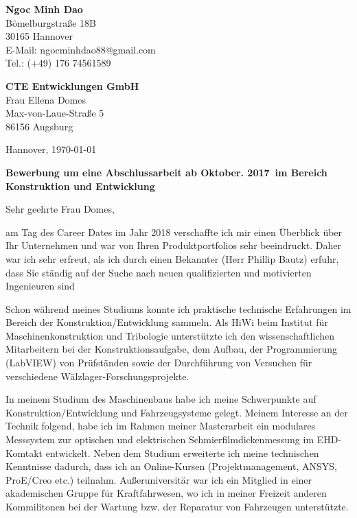 \documentclass[11pt,a4paper]{letter}
\newcommand{\FirmaName}{CTE Entwicklungen GmbH}
\newcommand{\FirmaAdresseLineOne}{Max-von-Laue-Straße 5}
\newcommand{\FirmaAdresseLineTwo}{86156 Augsburg}
\newcommand{\JobName}{Konstruktion und Entwicklung}
\newcommand{\JobRefNummer}{WO 71030}
\newcommand{\AnsprechpartnerVoll}{Frau Ellena Domes}
\newcommand{\Ansprechpartner}{Maier}
\newcommand{\Ansprechpartnerin}{Domes}
\newcommand{\Beginntermin}{Oktober. 2017}
\begin{document}
\pagestyle{empty}

\begin{flushleft}
    \textbf{Ngoc Minh Dao}\\
    Bömelburgstraße 18B\\
    30165 Hannover\\
    E-Mail: ngocminhdao88@gmail.com\\
    Tel.: (+49) 176 74561589
\end{flushleft}

\begin{flushleft}
    \textbf{\FirmaName}\\
    \AnsprechpartnerVoll\\
    \FirmaAdresseLineOne\\
    \FirmaAdresseLineTwo\\
\end{flushleft}

\begin{flushright}
    Hannover, \today
\end{flushright}

\textbf{Bewerbung um eine Abschlussarbeit ab \Beginntermin~im Bereich \JobName}\\
\vspace{1em}

Sehr geehrte Frau \Ansprechpartnerin,

am Tag des Career Dates im Jahr 2018 verschaffte ich mir einen Überblick über Ihr Unternehmen und war von Ihren Produktportfolios sehr beeindruckt.
Daher war ich sehr erfreut, als ich durch einen Bekannter (Herr Phillip Bautz) erfuhr, dass Sie ständig auf der Suche nach neuen qualifizierten und motivierten Ingenieuren sind

Schon während meines Studiums konnte ich praktische technische Erfahrungen im Bereich der Konstruktion/Entwicklung sammeln.
Als HiWi beim Institut für Maschinenkonstruktion und Tribologie unterstützte ich den wissenschaftlichen Mitarbeitern bei der Konstruktionsaufgabe, dem Aufbau, der Programmierung (LabVIEW) von Prüfständen sowie der Durchführung von Versuchen für verschiedene Wälzlager-Forschungsprojekte.

In meinem Studium des Maschinenbaus habe ich meine Schwerpunkte auf Konstruktion/Entwicklung und Fahrzeugsysteme gelegt.
Meinem Interesse an der Technik folgend, habe ich im Rahmen meiner Masterarbeit ein modulares Messsystem zur optischen und elektrischen Schmierfilmdickenmessung im EHD-Komtakt entwickelt.
Neben dem Studium erweiterte ich meine technischen Kenntnisse dadurch, dass ich an Online-Kursen (Projektmanagement, ANSYS, ProE/Creo etc.) teilnahm.
Außeruniversitär war ich ein Mitglied in einer akademischen Gruppe für Kraftfahrwesen, wo ich in meiner Freizeit anderen Kommilitonen bei der Wartung bzw. der Reparatur von Fahrzeugen unterstützte.
\end{document}
